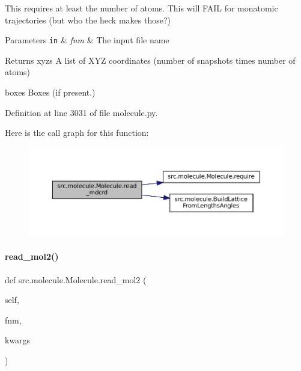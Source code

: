 This requires at least the number of atoms. This will F\+A\+IL for monatomic trajectories (but who the heck makes those?)


\begin{DoxyParams}[1]{Parameters}
\mbox{\tt in}  & {\em fnm} & The input file name \\
\hline
\end{DoxyParams}
\begin{DoxyReturn}{Returns}
xyzs A list of X\+YZ coordinates (number of snapshots times number of atoms) 

boxes Boxes (if present.) 
\end{DoxyReturn}


Definition at line 3031 of file molecule.\+py.

Here is the call graph for this function\+:
\nopagebreak
\begin{figure}[H]
\begin{center}
\leavevmode
\includegraphics[width=350pt]{classsrc_1_1molecule_1_1Molecule_aa7a40df32ff22ef52b902ac6a24dcb50_cgraph}
\end{center}
\end{figure}
\mbox{\label{classsrc_1_1molecule_1_1Molecule_a1d771e111c1cc4c8a0783b58081e282d}} 
\paragraph{\texorpdfstring{read\+\_\+mol2()}{read\_mol2()}}
{\footnotesize\ttfamily def src.\+molecule.\+Molecule.\+read\+\_\+mol2 (\begin{DoxyParamCaption}\item[{}]{self,  }\item[{}]{fnm,  }\item[{}]{kwargs }\end{DoxyParamCaption})}



